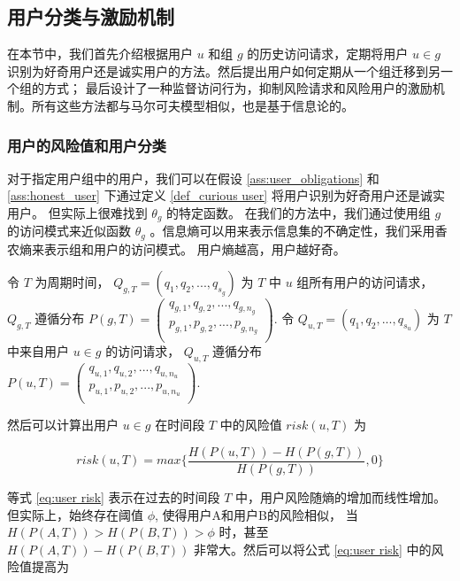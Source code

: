 \subsection{用户分类与激励机制}
\label{subsec:User classification and incentive mechanism}
在本节中，我们首先介绍根据用户 $u$ 和组 $g$ 的历史访问请求，定期将用户 $u \in g$ 识别为好奇用户还是诚实用户的方法。然后提出用户如何定期从一个组迁移到另一个组的方式； 最后设计了一种监督访问行为，抑制风险请求和风险用户的激励机制。所有这些方法都与马尔可夫模型相似，也是基于信息论的。

\subsubsection{用户的风险值和用户分类}
对于指定用户组中的用户，我们可以在假设 \ref{ass:user_obligations} 和 \ref{ass:honest_user} 下通过定义 \ref{def_curious user} 将用户识别为好奇用户还是诚实用户。  但实际上很难找到 $\theta_g$ 的特定函数。 在我们的方法中，我们通过使用组 $g$ 的访问模式来近似函数 $\theta_g$ 。信息熵可以用来表示信息集的不确定性，我们采用香农熵来表示组和用户的访问模式。 用户熵越高，用户越好奇。

令 $T$ 为周期时间， $Q_{g,T}=(q_1, q_2,...,q_{s_g})$ 为 $T$ 中 $u$ 组所有用户的访问请求， $Q_{g,T}$ 遵循分布
$P(g,T)=
(
\begin{array}{l}
q_{g,1},  q_{g,2}, ...,q_{g,n_g}\\
p_{g,1},  p_{g,2}, ...,p_{g,n_g}\\
\end{array}
)
$.
令 $Q_{u,T}=(q_1, q_2,...,q_{s_u})$ 为 $T$ 中来自用户 $u \in g$ 的访问请求， $Q_{u,T}$ 遵循分布
$P(u,T)=
(
\begin{array}{l}
q_{u,1},  q_{u,2}, ...,q_{u,n_u}\\
p_{u,1},  p_{u,2}, ...,p_{u,n_u}\\
\end{array}
)
$.

然后可以计算出用户 $u \in g$ 在时间段 $T$ 中的风险值 $risk(u,T)$ 为


\begin{equation}\label{eq:user risk}
risk(u,T)=max \{\frac{H(P(u,T))-H(P(g,T))}{H(P(g,T))},0\}
\end{equation}

等式 \ref{eq:user risk} 表示在过去的时间段 $T$ 中，用户风险随熵的增加而线性增加。但实际上，始终存在阈值 $\phi$, 使得用户A和用户B的风险相似， 当 $H(P(A,T))>H(P(B,T))>\phi$ 时，甚至 $H(P(A,T))-H(P(B,T))$ 非常大。然后可以将公式 \ref{eq:user risk} 中的风险值提高为


